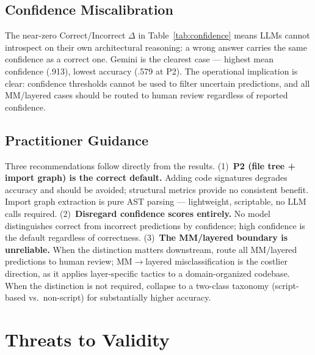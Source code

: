 \documentclass[runningheads]{llncs}
\begin{document}
\subsection{Confidence Miscalibration}

The near-zero Correct/Incorrect $\Delta$ in Table~\ref{tab:confidence} means LLMs cannot introspect on their own architectural reasoning: a wrong answer carries the same confidence as a correct one. Gemini is the clearest case --- highest mean confidence (.913), lowest accuracy (.579 at P2). The operational implication is clear: confidence thresholds cannot be used to filter uncertain predictions, and all MM/layered cases should be routed to human review regardless of reported confidence.

\subsection{Practitioner Guidance}

Three recommendations follow directly from the results. (1)~\textbf{P2 (file tree + import graph) is the correct default.} Adding code signatures degrades accuracy and should be avoided; structural metrics provide no consistent benefit. Import graph extraction is pure AST parsing --- lightweight, scriptable, no LLM calls required. (2)~\textbf{Disregard confidence scores entirely.} No model distinguishes correct from incorrect predictions by confidence; high confidence is the default regardless of correctness. (3)~\textbf{The MM/layered boundary is unreliable.} When the distinction matters downstream, route all MM/layered predictions to human review; MM$\to$layered misclassification is the costlier direction, as it applies layer-specific tactics to a domain-organized codebase. When the distinction is not required, collapse to a two-class taxonomy (script-based vs.\ non-script) for substantially higher accuracy.

\section{Threats to Validity}
\label{sec:threats}
\end{document}
